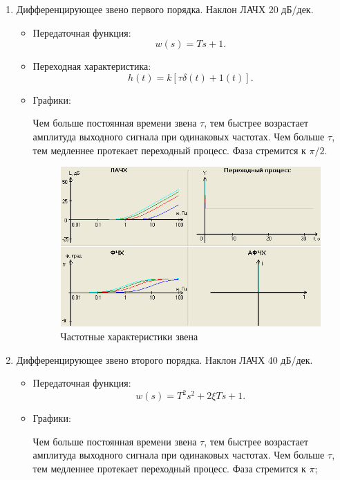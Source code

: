 \documentclass[unicode, 12pt, a4paper, oneside]{article}
\begin{document}
\begin{enumerate}
\item Дифференцирующее звено первого порядка. Наклон ЛАЧХ 20 дБ/дек.
	\begin{itemize}
	\item Передаточная функция:
		\begin{equation}
		w(s) = Ts + 1.
		\end{equation}
	
	\item Переходная характеристика:
		\begin{equation}
		h(t) = k [\tau \delta (t) + 1(t)].
		\end{equation}
	
	\item Графики:
	
	Чем больше постоянная времени звена $ \tau $, тем быстрее возрастает амплитуда выходного сигнала при одинаковых частотах. Чем больше $ \tau $, тем медленнее протекает переходный процесс. Фаза стремится к $ \pi/2 $.
	
		\begin{figure}[H]
		\centering
		\includegraphics[width=0.75\linewidth]{25_dif1.png}
		\caption{Частотные характеристики звена}
		\end{figure}
	\end{itemize}



\item Дифференцирующее звено второго порядка. Наклон ЛАЧХ 40 дБ/дек.
	\begin{itemize}
	\item Передаточная функция:
		\begin{equation}
		w(s) = T^2s^2 + 2\xi T s + 1.
		\end{equation}
	
	\item Графики:
	
	Чем больше постоянная времени звена $ \tau $, тем быстрее возрастает амплитуда выходного сигнала при одинаковых частотах. Чем больше $ \tau $, тем медленнее протекает переходный процесс. Фаза стремится к $ \pi $;
	

\end{itemize}
\end{enumerate}
\end{document}
